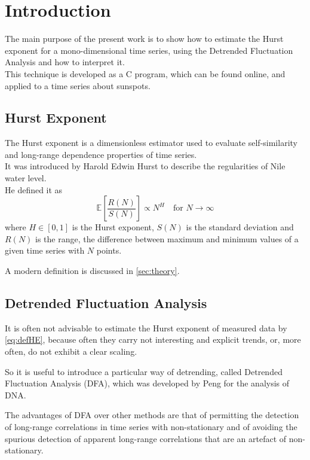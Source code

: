 \section{Introduction} 
The main purpose of the present work is to show how to estimate the Hurst exponent for a mono-dimensional time series, using the Detrended Fluctuation Analysis and how to interpret it. \\
This technique is developed as a C program, which can be found online\cite{Foradori}, and applied to a time series about sunspots. 

\subsection{Hurst Exponent}
The Hurst exponent is a dimensionless estimator used to evaluate self-similarity and long-range dependence properties of time series. \\
It was introduced by Harold Edwin Hurst to describe the regularities of Nile water level. \\
He defined it as
\begin{equation}
\mathbb{E} \left[\frac{R(N)}{S(N)}\right] \propto N^{H} \quad \text{for } N \to \infty
\label{eq:defHE}
\end{equation}
where $H \in \left[0, 1 \right] $ is the Hurst exponent, $S (N)$ is the standard deviation and $R(N)$ is the range, the difference between maximum and minimum values of a given time series with $N$ points.

A modern definition is discussed in \autoref{sec:theory}.

\subsection{Detrended Fluctuation Analysis}
It is often not advisable to estimate the Hurst exponent of measured data by \autoref{eq:defHE}, because often they carry not interesting and explicit trends, or, more often, do not exhibit a clear scaling.

So it is useful to introduce a particular way of detrending, called Detrended Fluctuation Analysis (DFA), which was developed by Peng \etal\cite{PhysRevE.49.1685} for the analysis of DNA.

The advantages of DFA over other methods are that of permitting the detection of long-range correlations in time series with non-stationary and of avoiding the spurious detection of apparent long-range correlations that are an artefact of non-stationary.

